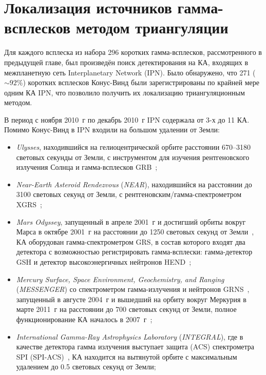 \chapter{Локализация источников гамма-всплесков методом триангуляции} \label{chapt2}
Для каждого всплеска из набора 296 коротких гамма-всплесков, рассмотренного в 
предыдущей главе, был произведён поиск детектирования на КА, входящих в межпланетную 
сеть Interplanetary Network (IPN). Было обнаружено, что 271 ($\sim 92$\%) коротких 
всплесков Конус-Винд были зарегистрированы по крайней мере одним КА IPN, 
что позволило получить их локализацию триангуляционным методом.

В период с ноября 2010~г по декабрь 2010~г IPN содержала от 3-х до 11 КА. 
Помимо Конус-Винд в IPN входили на большом удалении от Земли:
\begin{itemize}
\item \textit{Ulysses}, находившийся на гелиоцентрической орбите расстоянии 
670--3180 световых секунды от Земли, с инструментом для изучения рентгеновского 
излучения Солнца и гамма-всплесков GRB~\citep{Hurley_1992AAS};
\item \textit{Near-Earth Asteroid Rendezvous} (\textit{NEAR}), находившийся 
на расстоянии до 3100 световых секунд от Земли, с рентгеновским/гамма-спектрометром XGRS~\citep{Trombka_1999NIMPA};
\item \textit{Mars Odyssey}, запущенный в апреле 2001~г и достигший орбиты вокруг 
Марса в октябре 2001~г на расстоянии до 1250 световых секунд от Земли~\citep{Saunders_2004SSRv}, 
КА оборудован гамма-спектрометром GRS, в состав которого входят два детектора 
с возможностью регистрировать гамма-всплески: гамма-детектор GSH и детектор 
высокоэнергичных нейтронов HEND~\citep{Boynton_2004SSRv, Hurley_2006ApJS_MO};
\item \textit{Mercury Surface, Space Environment, Geochemistry, and Ranging} (\textit{MESSENGER}) 
со спектрометром гамма-излучения и нейтронов GRNS~\citep{Goldsten_2007SSRv}, 
запущенный в августе 2004~г и вышедший на орбиту вокруг Меркурия в марте 2011~г 
на расстоянии до 700 световых секунд от Земли, полное функционирование КА 
началось в 2007~г~\citep{Gold_2001PSS,Solomon_2007SSRv};
\item \textit{International Gamma-Ray Astrophysics Laboratory} (\textit{INTEGRAL}), 
где в качестве детектора гамма излучения выступает защита (ACS) спектрометра 
SPI (SPI-ACS)~\citep{Rau_2005AA}, КА находится на вытянутой орбите с максимальным 
удалением до 0.5 световых секунд от Земли;
\end{itemize}

